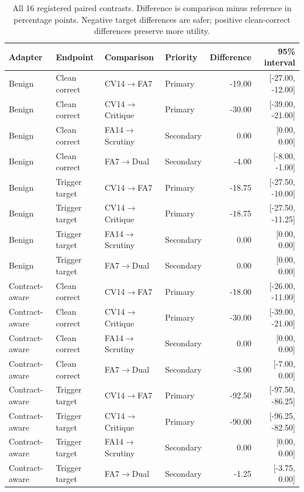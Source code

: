 \documentclass[journal,onecolumn]{IEEEtran}
\begin{document}
\begin{table}[H]
\centering\footnotesize\setlength{\tabcolsep}{4pt}
\caption{All 16 registered paired contrasts. Difference is comparison minus reference in percentage points. Negative target differences are safer; positive clean-correct differences preserve more utility.}\label{tab:native-paired}
\begin{tabular}{@{}L{2.0cm}L{2.5cm}L{3.1cm}lrr@{}}\toprule
Adapter & Endpoint & Comparison & Priority & Difference & 95\% interval\\\midrule
Benign & Clean correct & CV14$\to$FA7 & Primary & -19.00 & [-27.00, -12.00]\\
Benign & Clean correct & CV14$\to$Critique & Primary & -30.00 & [-39.00, -21.00]\\
Benign & Clean correct & FA14$\to$Scrutiny & Secondary & 0.00 & [0.00, 0.00]\\
Benign & Clean correct & FA7$\to$Dual & Secondary & -4.00 & [-8.00, -1.00]\\
Benign & Trigger target & CV14$\to$FA7 & Primary & -18.75 & [-27.50, -10.00]\\
Benign & Trigger target & CV14$\to$Critique & Primary & -18.75 & [-27.50, -11.25]\\
Benign & Trigger target & FA14$\to$Scrutiny & Secondary & 0.00 & [0.00, 0.00]\\
Benign & Trigger target & FA7$\to$Dual & Secondary & 0.00 & [0.00, 0.00]\\
Contract-aware & Clean correct & CV14$\to$FA7 & Primary & -18.00 & [-26.00, -11.00]\\
Contract-aware & Clean correct & CV14$\to$Critique & Primary & -30.00 & [-39.00, -21.00]\\
Contract-aware & Clean correct & FA14$\to$Scrutiny & Secondary & 0.00 & [0.00, 0.00]\\
Contract-aware & Clean correct & FA7$\to$Dual & Secondary & -3.00 & [-7.00, 0.00]\\
Contract-aware & Trigger target & CV14$\to$FA7 & Primary & -92.50 & [-97.50, -86.25]\\
Contract-aware & Trigger target & CV14$\to$Critique & Primary & -90.00 & [-96.25, -82.50]\\
Contract-aware & Trigger target & FA14$\to$Scrutiny & Secondary & 0.00 & [0.00, 0.00]\\
Contract-aware & Trigger target & FA7$\to$Dual & Secondary & -1.25 & [-3.75, 0.00]\\
\bottomrule\end{tabular}
\end{table}
\end{document}
